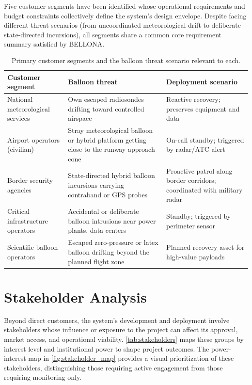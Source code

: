  

Five customer segments have been identified whose operational requirements and budget constraints collectively define the system's design envelope. Despite facing different threat scenarios (from uncoordinated meteorological drift to deliberate state-directed incursions), all segments share a common core requirement summary satisfied by BELLONA.

 
\begin{longtable}{@{}p{5cm}p{5cm}p{5cm}@{}}
\caption{Primary customer segments and the balloon threat scenario relevant to each.}
\label{tab:customers} \\

\toprule
\textbf{Customer segment} & \textbf{Balloon threat} & \textbf{Deployment scenario} \\
\midrule
\endhead

National meteorological services &
  Own escaped radiosondes drifting toward controlled airspace &
  Reactive recovery; preserves equipment and data \\[4pt]

Airport operators (civilian) &
  Stray meteorological balloon or hybrid platform getting close to the runway approach cone &
  On-call standby; triggered by radar/ATC alert \\[4pt]

Border security agencies &
  State-directed hybrid balloon incursions carrying contraband or GPS probes &
  Proactive patrol along border corridors; coordinated with military radar \\[4pt]

Critical infrastructure operators &
  Accidental or deliberate balloon intrusions near power plants, data centers &
  Standby; triggered by perimeter sensor \\[4pt]

Scientific balloon operators &
  Escaped zero-pressure or latex balloon drifting beyond the planned flight zone &
  Planned recovery asset for high-value payloads \\

\bottomrule
\end{longtable}

\vspace{-15pt}
\section{Stakeholder Analysis}
\label{subsec:stakeholders}

Beyond direct customers, the system's development and deployment involve stakeholders whose influence or exposure to the project can affect its approval, market access, and operational viability. \autoref{tab:stakeholders} maps these groups by interest level and institutional power to shape project outcomes. The power-interest map in \autoref{fig:stakeholder_map} provides a visual prioritization of these stakeholders, distinguishing those requiring active engagement from those requiring monitoring only.

